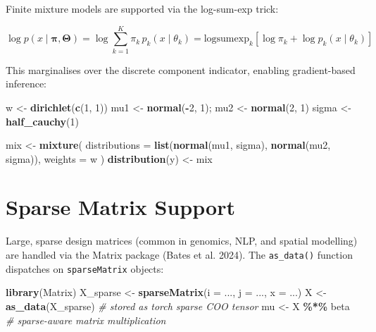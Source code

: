 \documentclass[
  11pt,
]{article}
\newenvironment{Shaded}{\begin{snugshade}}{\end{snugshade}}
\newcommand{\AttributeTok}[1]{\textcolor[rgb]{0.13,0.29,0.53}{#1}}
\newcommand{\CommentTok}[1]{\textcolor[rgb]{0.56,0.35,0.01}{\textit{#1}}}
\newcommand{\DecValTok}[1]{\textcolor[rgb]{0.00,0.00,0.81}{#1}}
\newcommand{\FunctionTok}[1]{\textcolor[rgb]{0.13,0.29,0.53}{\textbf{#1}}}
\newcommand{\NormalTok}[1]{#1}
\newcommand{\OtherTok}[1]{\textcolor[rgb]{0.56,0.35,0.01}{#1}}
\newcommand{\SpecialCharTok}[1]{\textcolor[rgb]{0.81,0.36,0.00}{\textbf{#1}}}
\begin{document}
Finite mixture models are supported via the log-sum-exp trick:

\[\log p(x \mid \boldsymbol\pi, \boldsymbol\Theta) = \log \sum_{k=1}^{K} \pi_k \, p_k(x \mid \theta_k) = \text{logsumexp}_k \left[\log \pi_k + \log p_k(x \mid \theta_k)\right]\]

This marginalises over the discrete component indicator, enabling
gradient-based inference:

\begin{Shaded}
\begin{Highlighting}[]
\NormalTok{w }\OtherTok{\textless{}{-}} \FunctionTok{dirichlet}\NormalTok{(}\FunctionTok{c}\NormalTok{(}\DecValTok{1}\NormalTok{, }\DecValTok{1}\NormalTok{))}
\NormalTok{mu1 }\OtherTok{\textless{}{-}} \FunctionTok{normal}\NormalTok{(}\SpecialCharTok{{-}}\DecValTok{2}\NormalTok{, }\DecValTok{1}\NormalTok{); mu2 }\OtherTok{\textless{}{-}} \FunctionTok{normal}\NormalTok{(}\DecValTok{2}\NormalTok{, }\DecValTok{1}\NormalTok{)}
\NormalTok{sigma }\OtherTok{\textless{}{-}} \FunctionTok{half\_cauchy}\NormalTok{(}\DecValTok{1}\NormalTok{)}

\NormalTok{mix }\OtherTok{\textless{}{-}} \FunctionTok{mixture}\NormalTok{(}
  \AttributeTok{distributions =} \FunctionTok{list}\NormalTok{(}\FunctionTok{normal}\NormalTok{(mu1, sigma), }\FunctionTok{normal}\NormalTok{(mu2, sigma)),}
  \AttributeTok{weights =}\NormalTok{ w}
\NormalTok{)}
\FunctionTok{distribution}\NormalTok{(y) }\OtherTok{\textless{}{-}}\NormalTok{ mix}
\end{Highlighting}
\end{Shaded}

\section{Sparse Matrix Support}\label{sparse-matrix-support}

Large, sparse design matrices (common in genomics, NLP, and spatial
modelling) are handled via the Matrix package (Bates et al. 2024). The
\texttt{as\_data()} function dispatches on \texttt{sparseMatrix}
objects:

\begin{Shaded}
\begin{Highlighting}[]
\FunctionTok{library}\NormalTok{(Matrix)}
\NormalTok{X\_sparse }\OtherTok{\textless{}{-}} \FunctionTok{sparseMatrix}\NormalTok{(}\AttributeTok{i =}\NormalTok{ ..., }\AttributeTok{j =}\NormalTok{ ..., }\AttributeTok{x =}\NormalTok{ ...)}
\NormalTok{X }\OtherTok{\textless{}{-}} \FunctionTok{as\_data}\NormalTok{(X\_sparse)  }\CommentTok{\# stored as torch sparse COO tensor}
\NormalTok{mu }\OtherTok{\textless{}{-}}\NormalTok{ X }\SpecialCharTok{\%*\%}\NormalTok{ beta         }\CommentTok{\# sparse{-}aware matrix multiplication}
\end{Highlighting}
\end{Shaded}
\end{document}
